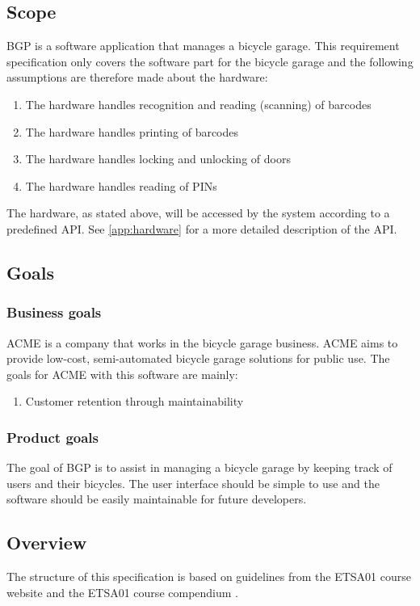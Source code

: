 \documentclass[12pt,titlepage,bibliography=totoc]{article}
\begin{document}
\subsection{Scope}
BGP is a software application that manages a bicycle garage. This requirement specification only covers the software part for the bicycle garage and the following assumptions are therefore made about the hardware:
\begin{enumerate}
	\item The hardware handles recognition and reading (scanning) of barcodes
	\item The hardware handles printing of barcodes
	\item The hardware handles locking and unlocking of doors
	\item The hardware handles reading of PINs
\end{enumerate}
The hardware, as stated above, will be accessed by the system according to a predefined API. See \cref{app:hardware} for a more detailed description of the API.

\subsection{Goals}
\subsubsection{Business goals}
ACME is a company that works in the bicycle garage business. ACME aims to provide low-cost, semi-automated bicycle garage solutions for public use. The goals for ACME with this software are mainly:
\begin{enumerate}
	\item Customer retention through maintainability
\end{enumerate}
\subsubsection{Product goals}
The goal of BGP is to assist in managing a bicycle garage by keeping track of users and their bicycles. The user interface should be simple to use and the software should be easily maintainable for future developers.

\subsection{Overview}
The structure of this specification is based on guidelines from the ETSA01 course website and the ETSA01 course compendium \cite{kompendium,course-site}.
\end{document}
